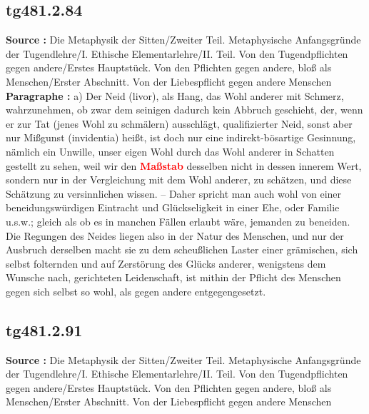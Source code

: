 \documentclass[a4paper,12pt,twoside]{book}
\newcommand{\match}[1]{\textcolor{red}{\textbf{#1}}}
\begin{document}
	\subsection*{tg481.2.84} 
	\textbf{Source : }Die Metaphysik der Sitten/Zweiter Teil. Metaphysische Anfangsgründe der Tugendlehre/I. Ethische Elementarlehre/II. Teil. Von den Tugendpflichten gegen andere/Erstes Hauptstück. Von den Pflichten gegen andere, bloß als Menschen/Erster Abschnitt. Von der Liebespflicht gegen andere Menschen\\  
	
	\textbf{Paragraphe : }a) Der Neid (livor), als Hang, das Wohl anderer mit Schmerz, wahrzunehmen, ob zwar dem seinigen dadurch kein Abbruch geschieht, der, wenn er zur Tat (jenes Wohl zu schmälern) ausschlägt, qualifizierter Neid, sonst aber nur Mißgunst (invidentia) heißt, ist doch nur eine indirekt-bösartige Gesinnung, nämlich ein Unwille, unser eigen Wohl durch das Wohl anderer in Schatten gestellt zu sehen, weil wir den \match{Maßstab} desselben nicht in dessen innerem Wert, sondern nur in der Vergleichung mit dem Wohl anderer, zu schätzen, und diese Schätzung zu versinnlichen wissen. – Daher spricht man auch wohl von einer beneidungswürdigen Eintracht und Glückseligkeit in einer Ehe, oder Familie u.s.w.; gleich als ob es in manchen Fällen erlaubt wäre, jemanden zu beneiden. Die Regungen des Neides liegen also in der Natur des Menschen, und nur der Ausbruch derselben macht sie zu dem scheußlichen Laster einer grämischen, sich selbst folternden und auf Zerstörung des Glücks anderer, wenigstens dem Wunsche nach, gerichteten Leidenschaft, ist mithin der Pflicht des Menschen gegen sich selbst so wohl, als gegen andere entgegengesetzt. 
	
	\subsection*{tg481.2.91} 
	\textbf{Source : }Die Metaphysik der Sitten/Zweiter Teil. Metaphysische Anfangsgründe der Tugendlehre/I. Ethische Elementarlehre/II. Teil. Von den Tugendpflichten gegen andere/Erstes Hauptstück. Von den Pflichten gegen andere, bloß als Menschen/Erster Abschnitt. Von der Liebespflicht gegen andere Menschen\\  
	
\end{document}

